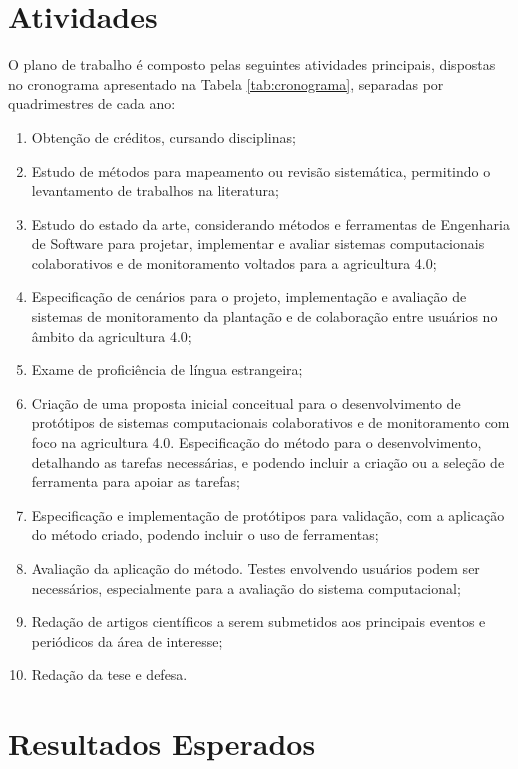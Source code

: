 \documentclass[12pt]{article}
\begin{document}
\section{Atividades}
\label{sec:atividades}

O plano de trabalho é composto pelas seguintes atividades principais, dispostas no cronograma apresentado na Tabela \ref{tab:cronograma}, separadas por quadrimestres de cada ano:

\begin{enumerate}
	\item Obtenção de créditos, cursando disciplinas;
	\item Estudo de métodos para mapeamento ou revisão sistemática, permitindo o levantamento de trabalhos na literatura;
	\item Estudo do estado da arte, considerando métodos e ferramentas de Engenharia de Software para projetar, implementar e avaliar sistemas computacionais colaborativos e de monitoramento voltados para a agricultura 4.0;
	\item Especificação de cenários para o projeto, implementação e avaliação de sistemas de monitoramento da plantação e de colaboração entre usuários no âmbito da agricultura 4.0;
	\item Exame de proficiência de língua estrangeira;
	\item Criação de uma proposta inicial conceitual para o desenvolvimento de protótipos de sistemas computacionais colaborativos e de monitoramento com foco na agricultura 4.0. Especificação do método para o desenvolvimento, detalhando as tarefas necessárias, e podendo incluir a criação ou a seleção de ferramenta para apoiar as tarefas;
	\item Especificação e implementação de protótipos para validação, com a aplicação do método criado, podendo incluir o uso de ferramentas;
	\item Avaliação da aplicação do método. Testes envolvendo usuários podem ser necessários, especialmente para a avaliação do sistema computacional;
	\item Redação de artigos científicos a serem submetidos aos principais eventos e periódicos da área de interesse;
	\item Redação da tese e defesa.
\end{enumerate}

\section{Resultados Esperados}
\label{sec:resultados_esperados}
\end{document}
